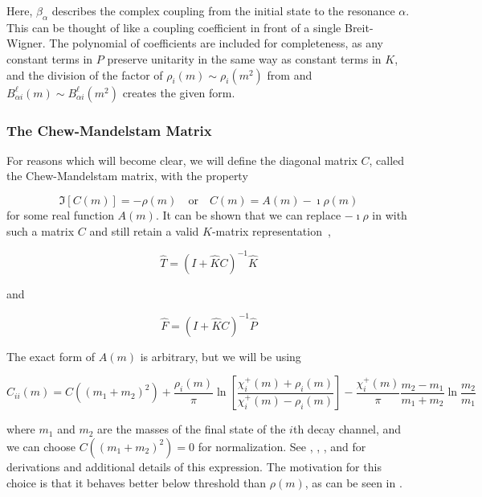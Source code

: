 Here, $\beta_\alpha$ describes the complex coupling from the initial state to the resonance $\alpha$. This can be thought of like a coupling coefficient in front of a single Breit-Wigner. The polynomial of coefficients are included for completeness, as any constant terms in $P$ preserve unitarity in the same way as constant terms in $K$, and the division of the factor of $\rho_i(m) \sim \rho_i(m^2)$ from  and $B^\ell_{\alpha i}(m) \sim B^\ell_{\alpha i}(m^2)$ creates the given form.

\subsubsection{The Chew-Mandelstam Matrix}

For reasons which will become clear, we will define the diagonal matrix $C$, called the Chew-Mandelstam matrix, with the property

\begin{equation}
  \Im[C(m)] = -\rho(m)\quad\text{or}\quad C(m) = A(m) - \imath\rho(m)
\end{equation}
for some real function $A(m)$. It can be shown that we can replace $-\imath\rho$ in  with such a matrix $C$ and still retain a valid $K$-matrix representation~\cite{wilson_resonances_2015},

\begin{equation}
  \hat{T} = (I + \hat{K}C)^{-1}\hat{K}
\end{equation}

and

\begin{equation}
  \hat{F} = (I + \hat{K}C)^{-1}\hat{P}
  \label{eq:k-matrix-production-amplitude-chew}
\end{equation}

The exact form of $A(m)$ is arbitrary, but we will be using

\begin{equation}
  C_{ii}(m) = C((m_1 + m_2)^2) + \frac{\rho_i(m)}{\pi}\ln\left[\frac{\chi^+_i(m) + \rho_i(m)}{\chi^+_i(m) - \rho_i(m)}\right] - \frac{\chi^+_i(m)}{\pi}\frac{m_2 - m_1}{m_1 + m_2}\ln\frac{m_2}{m_1}
  \label{eq:chew-mandelstam}
\end{equation}

where $m_1$ and $m_2$ are the masses of the final state of the $i$th decay channel, and we can choose $C((m_1 + m_2)^2) = 0$ for normalization. See \cite{oller_nd_1999}, \cite{basdevant_unitary_1977}, \cite{oller_chiral_2001}, and \cite{reid_generating_1984} for derivations and additional details of this expression. The motivation for this choice is that it behaves better below threshold than $\rho(m)$, as can be seen in .

